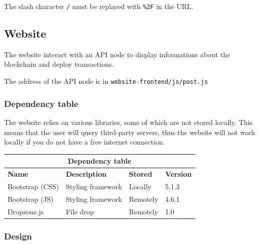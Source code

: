 \documentclass[../documentation.tex]{subfiles}
\begin{document}
The slash character \texttt{/} must be replaced with \texttt{\%2F} in the URL.

\pagebreak

\subsection{Website}

The website interact with an API node to display informations about the blockchain
and deploy transactions.

The address of the API node is in \texttt{website-frontend/js/post.js}

\subsubsection{Dependency table}

The website relies on various libraries, some of which are not stored locally.
This means that the user will query third-party servers, thus the website will not work
locally if you do not have a free internet connection.

\medskip

\bgroup{}
\def\arraystretch{1.5}
\begin{center}
    \begin{tabular}{ |p{3cm}|p{4cm}|p{2cm}|p{2cm}| }
        \hline
        \multicolumn{4}{|c|}{\textbf{Dependency table}} \\
        \hline
        \textbf{Name} & \textbf{Description} & \textbf{Stored} & \textbf{Version} \\
        \hline
        Bootstrap (CSS) & Styling framework & Locally & 5.1.3 \\
        \hline
        Bootstrap (JS) & Styling framework & Remotely & 4.6.1 \\
        \hline
        Dropzone.js & File drop & Remotely & 1.0 \\
        \hline
    \end{tabular}
\end{center}
\egroup{}

\pagebreak

\subsubsection{Design}

\end{document}
